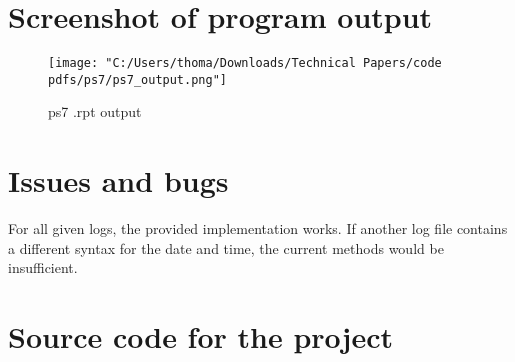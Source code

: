 \documentclass[12pt]{article}
\begin{document}
\section[4]{Screenshot of program output}
\begin{figure}[H]
  \centering
  \texttt{[image: "C:/Users/thoma/Downloads/Technical Papers/code pdfs/ps7/ps7\_output.png"]}
  \caption{ps7 .rpt output}
  \label{fig:ps7_output}
\end{figure}

\section[5]{Issues and bugs}
\hfill\begin{minipage}{\dimexpr\textwidth-1cm}
For all given logs, the provided implementation works. \newline
If another log file contains a different syntax for the date and time,
the current methods would be insufficient.
\end{minipage}

\section[6]{Source code for the project}
\end{document}
